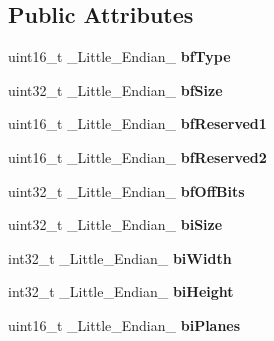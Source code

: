\subsection*{Public Attributes}
\begin{DoxyCompactItemize}
\item 
\hypertarget{structGCC__ATTRIBUTE_a8a270d203f46aebc5c2b79b281314acd}{uint16\-\_\-t \-\_\-\-Little\-\_\-\-Endian\-\_\- {\bfseries bf\-Type}}\label{structGCC__ATTRIBUTE_a8a270d203f46aebc5c2b79b281314acd}

\item 
\hypertarget{structGCC__ATTRIBUTE_ab8a10012c8006abdbccbcae083ca0e32}{uint32\-\_\-t \-\_\-\-Little\-\_\-\-Endian\-\_\- {\bfseries bf\-Size}}\label{structGCC__ATTRIBUTE_ab8a10012c8006abdbccbcae083ca0e32}

\item 
\hypertarget{structGCC__ATTRIBUTE_ad932e4420b9108bc4265413808764454}{uint16\-\_\-t \-\_\-\-Little\-\_\-\-Endian\-\_\- {\bfseries bf\-Reserved1}}\label{structGCC__ATTRIBUTE_ad932e4420b9108bc4265413808764454}

\item 
\hypertarget{structGCC__ATTRIBUTE_a2fb1e71a93a8fb44182c71343197cc01}{uint16\-\_\-t \-\_\-\-Little\-\_\-\-Endian\-\_\- {\bfseries bf\-Reserved2}}\label{structGCC__ATTRIBUTE_a2fb1e71a93a8fb44182c71343197cc01}

\item 
\hypertarget{structGCC__ATTRIBUTE_a9355688d4f6bb1a73baa02e1a02d38f1}{uint32\-\_\-t \-\_\-\-Little\-\_\-\-Endian\-\_\- {\bfseries bf\-Off\-Bits}}\label{structGCC__ATTRIBUTE_a9355688d4f6bb1a73baa02e1a02d38f1}

\item 
\hypertarget{structGCC__ATTRIBUTE_ac4897f001fded3194cb3db2d4415682a}{uint32\-\_\-t \-\_\-\-Little\-\_\-\-Endian\-\_\- {\bfseries bi\-Size}}\label{structGCC__ATTRIBUTE_ac4897f001fded3194cb3db2d4415682a}

\item 
\hypertarget{structGCC__ATTRIBUTE_a924faf6ab6cd24df094984077fc2fe62}{int32\-\_\-t \-\_\-\-Little\-\_\-\-Endian\-\_\- {\bfseries bi\-Width}}\label{structGCC__ATTRIBUTE_a924faf6ab6cd24df094984077fc2fe62}

\item 
\hypertarget{structGCC__ATTRIBUTE_aea9ede67a8381b14151e61fd6356d58c}{int32\-\_\-t \-\_\-\-Little\-\_\-\-Endian\-\_\- {\bfseries bi\-Height}}\label{structGCC__ATTRIBUTE_aea9ede67a8381b14151e61fd6356d58c}

\item 
\hypertarget{structGCC__ATTRIBUTE_a197f6feb6b6926015af257166350ca32}{uint16\-\_\-t \-\_\-\-Little\-\_\-\-Endian\-\_\- {\bfseries bi\-Planes}}\label{structGCC__ATTRIBUTE_a197f6feb6b6926015af257166350ca32}


\end{DoxyCompactItemize}
